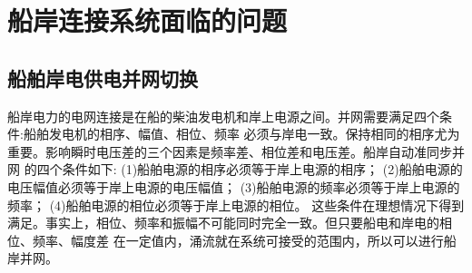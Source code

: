 

\zhlipsum[4]


\begin{table}[!htp]
	\centering
	\caption[船用岸电供电方式比较]{船用岸电供电方式比较}
	\label{tab:船用岸电供电方式比较}
\end{table}




\section{船岸连接系统面临的问题}
\subsection{船舶岸电供电并网切换}
船岸电力的电网连接是在船的柴油发电机和岸上电源之间。并网需要满足四个条件:船舶发电机的相序、幅值、相位、频率
必须与岸电一致。保持相同的相序尤为重要。影响瞬时电压差的三个因素是频率差、相位差和电压差。船岸自动准同步并网
的四个条件如下:
(1)船舶电源的相序必须等于岸上电源的相序；
(2)船舶电源的电压幅值必须等于岸上电源的电压幅值；
(3)船舶电源的频率必须等于岸上电源的频率；
(4)船舶电源的相位必须等于岸上电源的相位。
这些条件在理想情况下得到满足。事实上，相位、频率和振幅不可能同时完全一致。但只要船电和岸电的相位、频率、幅度差
在一定值内，涌流就在系统可接受的范围内，所以可以进行船岸并网。

